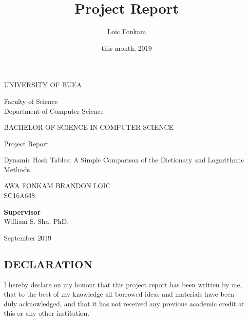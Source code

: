 \documentclass[a4paper,12pt, openany]{book}
\title{Project Report}
\author{Loïc Fonkam}
\date{this month, 2019}
\begin{document}
\thispagestyle{empty}
\linespread{1.25}      %
\begin{center}
	\begin{LARGE}
		 UNIVERSITY OF BUEA
	\end{LARGE}
	\bigbreak
	\vspace*{0.5in}
	Faculty of Science \\[.5cm]
	
	Department of Computer Science
	
	
	
	\begin{center}
		
		
		\vspace*{0.8in} 
		\begin{LARGE}
			\begin{doublespace}
					 BACHELOR OF SCIENCE IN COMPUTER SCIENCE
			\end{doublespace}

		\end{LARGE}  
	\bigbreak
		Project Report\\[.2cm]
		\begin{Large}
			Dynamic Hash Tables: A Simple Comparison of the Dictionary and Logarithmic Methods.
		\end{Large}\bigbreak
		
		
		
	\end{center}
	
	
	
	
	\begin{center}
		
		
		\vspace*{1in}
		
		\textsc{ AWA FONKAM BRANDON LOIC } \\
		\textsc{SC16A648}
		
		
		
		
		
		
		\vspace*{0.7in}  \textbf{Supervisor} \\
		\vspace{0.1in}  William S. Shu, PhD.
	
		\bigbreak
		\bigbreak
		\bigbreak
		{\large September 2019}
	\end{center}
\end{center}

\newpage
\vspace*{1in}
\setcounter{page}{1}
\vspace*{0.1\textheight}
\begin{center}
	\section*{DECLARATION}
	\vspace*{.2in}
\end{center}
I hereby declare on my honour that this project report has been written by me, that to the best of my knowledge all borrowed ideas and materials have been duly acknowledged, and that it has not received any previous academic credit at this or any other institution.\\[1cm]
\end{document}
